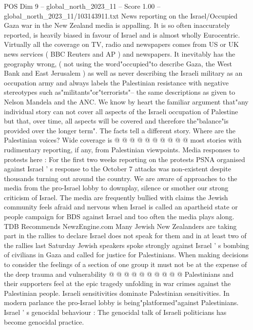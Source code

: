 \begin{textsample}{POS Dim 9 – global\_north\_2023\_11 – Score 1.00 – global\_north\_2023\_11/103143911.txt}  \label{ex:f9_pos_160}
News reporting on the Israel/Occupied Gaza war in the New Zealand media is appalling.
It is so often inaccurately reported, is heavily biased in favour of Israel and is almost wholly Eurocentric.
Virtually all the coverage on TV, radio and newspapers comes from US or UK news services ( BBC Reuters and AP ) and newspapers.
It inevitably has the geography wrong, ( not using the word"occupied"to describe Gaza, the West Bank and East Jerusalem ) as well as never describing the Israeli military as an occupation army and always labels the Palestinian resistance with negative stereotypes such as"militants"or"terrorists"-- the same descriptions as given to Nelson Mandela and the ANC.
We know by heart the familiar argument that"any individual story can not cover all aspects of the Israeli occupation of Palestine but that, over time, all aspects will be covered and therefore the"balance"is provided over the longer term".
The facts tell a different story.
Where are the Palestinian voices?
Wide coverage is @ @ @ @ @ @ @ @ @ @ most stories with rudimentary reporting, if any, from Palestinian viewpoints.
Media responses to protests here : For the first two weeks reporting on the protests PSNA organised against Israel ' s response to the October 7 attacks was non-existent despite thousands turning out around the country.
We are aware of approaches to the media from the pro-Israel lobby to downplay, silence or smother our strong criticism of Israel.
The media are frequently bullied with claims the Jewish community feels afraid and nervous when Israel is called an apartheid state or people campaign for BDS against Israel and too often the media plays along.
TDB Recommends NewzEngine.com Many Jewish New Zealanders are taking part in the rallies to declare Israel does not speak for them and in at least two of the rallies last Saturday Jewish speakers spoke strongly against Israel ' s bombing of civilians in Gaza and called for justice for Palestinians.
When making decisions to consider the feelings of a section of one group it must not be at the expense of the deep trauma and vulnerability @ @ @ @ @ @ @ @ @ @ Palestinians and their supporters feel at the epic tragedy unfolding in war crimes against the Palestinian people.
Israeli sensitivities dominate Palestinian sensitivities.
In modern parlance the pro-Israel lobby is being"platformed"against Palestinians.
Israel ' s genocidal behaviour : The genocidal talk of Israeli politicians has become genocidal practice.

\end{textsample}
